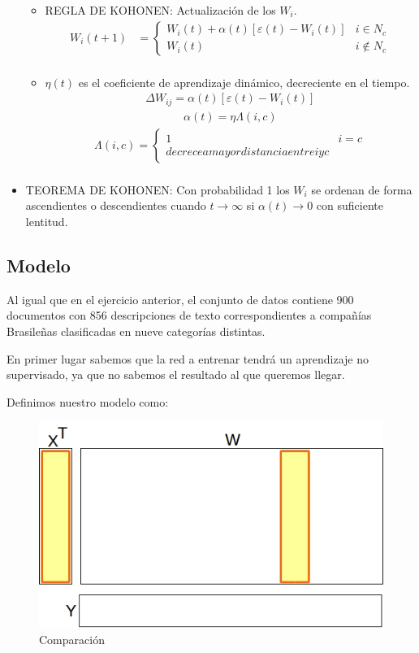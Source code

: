 \begin{itemize}
\begin{itemize}
			\item REGLA DE KOHONEN: Actualización de los $W_{i}$.
					\begin{align*}
					 W_{i}(t+1) &=  \begin{cases}
										W_{i}(t) + \alpha(t) [ \varepsilon(t) - W_{i}(t) ] & i \in N_{c} \\
										W_{i}(t)                                           & i \not \in N_{c}  
									\end{cases} \\
					\end{align*}
			\item $\eta(t)$ es el coeficiente de aprendizaje dinámico, decreciente en el tiempo.
				\begin{align*}
					\Delta W_{ij} = \alpha(t) [ \varepsilon(t) - W_{i}(t) ]
				\end{align*}
				\begin{align*}
					\alpha(t) = \eta \Lambda(i,c)
				\end{align*}
				\begin{align*}
					\Lambda(i,c) = \begin{cases}
										1 & i = c \\
										decrece a mayor distancia entre i y c 
									\end{cases} \\
				\end{align*}
		\end{itemize}
	\item TEOREMA DE KOHONEN: Con probabilidad 1 los $W_{i}$ se ordenan de forma ascendientes o descendientes cuando $t \to
		\infty$ si $\alpha(t) \to 0$ con suficiente lentitud.
\end{itemize}

\subsection{Modelo}
Al igual que en el ejercicio anterior, el conjunto de datos contiene 900 documentos con 856 descripciones de texto 
correspondientes a compañías Brasileñas clasificadas en nueve categorías distintas.

En primer lugar sabemos que la red a entrenar tendrá un aprendizaje no supervisado, ya que no sabemos el resultado al que
queremos llegar.

Definimos nuestro modelo como:

\begin{figure}[ht!]
	\centering
	\includegraphics[width=0.7\linewidth]{img/parte2-comparacion.jpg}
	\caption{Comparación}
\end{figure}

